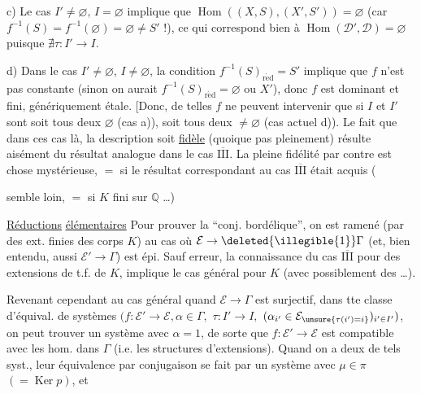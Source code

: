 

c) Le cas $I'\ne\varnothing$, $I=\varnothing$ implique que $\operatorname{Hom}((X,S),(X',S'))=\varnothing$ (car $f^{-1}(S)=f^{-1}(\varnothing)=\varnothing\ne S'$ !), ce qui correspond bien  à $\operatorname{Hom}(\mathcal D',\mathcal D)=\varnothing$ puisque $\nexists\tau:I'\to I$.

d) Dans le cas $I'\ne\varnothing$, $I\ne\varnothing$, la condition $f^{-1}(S)_{\mathrm{r\acute ed}}=S'$ implique que $f$ n'est pas constante (sinon on aurait $f^{-1}(S)_{\mathrm{r\acute ed}}=\varnothing$ ou $X'$), donc $f$ est dominant et fini, génériquement étale. [Donc, de telles $f$ ne  peuvent intervenir que si $I$ et $I'$ sont soit tous deux $\varnothing$ (cas a)), soit tous deux $\ne\varnothing$ (cas actuel d)). Le fait que dans ces cas là, la description  soit \uline{fidèle} (quoique pas pleinement) résulte aisément du résultat analogue dans le cas \uline{$\overline{\mathrm{III}}$}.
La pleine fidélité par contre est chose mystérieuse, $=$ si le résultat correspondant   au cas \uline{$\overline{\mathrm{III}}$} était acquis (



semble loin, $=$ si $K$ fini sur $\mathbb Q$ \ldots)

\uline{Réductions} \uline{élémentaires} Pour prouver la ``conj. bordélique'', on est ramené (par des ext. finies des corps $K$) au cas où $\mathcal E\to\deleted{\illegible{1}}\Gamma$ (et, bien entendu, aussi $\mathcal E'\to\Gamma$) est épi. Sauf erreur, la connaissance du cas \uline{$\overline{\mathrm{III}}$} pour des extensions de t.f. de $K$, implique le cas général pour $K$ (avec possiblement des  \ldots).

Revenant cependant au cas général quand $\mathcal E\to\Gamma$ est surjectif, dans tte classe d'équival. de systèmes $(f:\mathcal E'\to\mathcal E,\alpha\in\Gamma,$  $\tau:I'\to I,$  $(\alpha_{i'}\in\mathcal E_{\unsure{\tau(i')=i}})_{i'\in I'})$, on peut trouver un système avec $\alpha=1$, de sorte que $f:\mathcal E'\to\mathcal E$ est compatible avec les hom. dans $\Gamma$ (i.e. les structures d'extensions).
Quand on a deux de tels syst., leur équivalence par conjugaison se fait par un système  avec \uline{$\mu\in\pi$} $(=\operatorname{Ker}p)$, et


